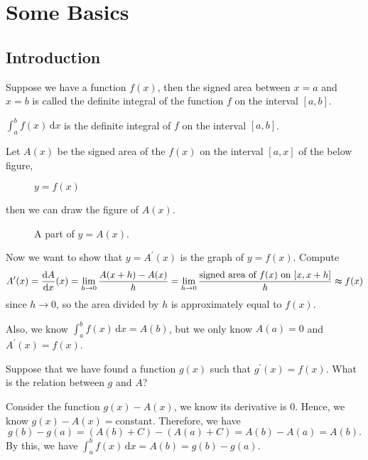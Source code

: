 \chapter{Some Basics}
\section{Introduction}
\begin{definition}
  Suppose we have a function \(f(x)\), then the signed area between \(x=a\) and \(x=b\) is called the definite integral of the function \(f\) on the interval \([a,b]\).  
\end{definition}

\begin{notation}
  \(\int _a^b f(x) \, \mathrm{d}x\) is the definite integral of \(f\) on the interval \([a,b]\).   
\end{notation}

Let \(A(x)\) be the signed area of the \(f(x)\) on the interval \([a,x]\)  of the below figure,

\begin{figure}[H]
  \centering
  \caption{\(y=f(x)\) }
  \label{fig:signed_area}
\end{figure}
then we can draw the figure of \(A(x)\). 

\begin{figure}[H]
  \centering
  \caption{A part of \(y=A(x)\).}
  \label{fig:Ax}
\end{figure}

Now we want to show that \(y=A^{\prime} (x)\) is the graph of \(y=f(x)\). Compute
\[
  A^{\prime} (x) = \frac{\mathrm{d}A}{\mathrm{d}x}(x) = \lim_{h \to 0} \frac{A(x+h)-A(x)}{h} =  \lim_{h \to 0} \frac{\text{signed area of } f(x) \text{ on } [x,x+h]}{h} \thickapprox f(x)
\]
since \(h \to 0\), so the area divided by \(h\) is approximately equal to \(f(x)\). 

Also, we know \(\int _a^b f(x) \, \mathrm{d}x = A(b)\), but we only know \(A(a)=0\) and \(A^{\prime} (x)=f(x)\).

Suppose that we have found a function \(g(x)\) such that \(g^{\prime} (x) = f(x)\). What is the relation between \(g\) and \(A\)?

Consider the function \(g(x)-A(x)\), we know its derivative is \(0\). Hence, we know \(g(x) - A(x) = \text{constant}\). Therefore, we have 
\[
  g(b)-g(a) = \left( A(b) + C \right) - \left( A(a) + C \right) = A(b) - A(a) = A(b).  
\] 
By this, we have \(\int _a^b f(x) \, \mathrm{d} x = A(b) = g(b) - g(a)\).

